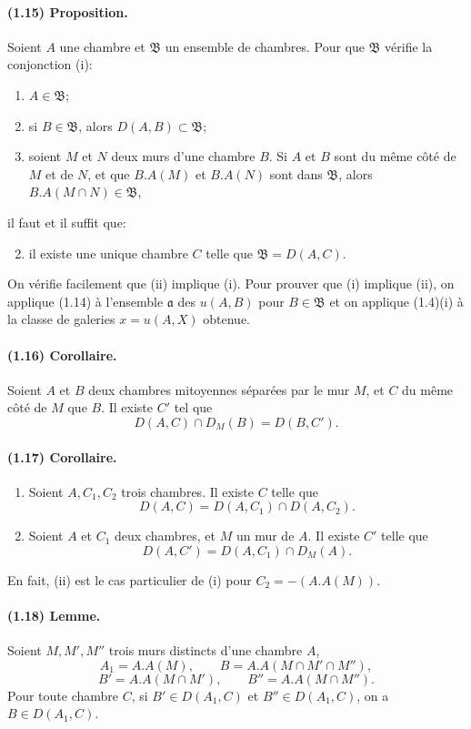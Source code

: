 \documentclass[10pt]{article}
\begin{document}
\paragraph{(1.15) Proposition.} Soient $A$ une chambre et $\mathfrak B$ un ensemble de chambres. Pour que $\mathfrak B$ vérifie la conjonction (i):
\begin{enumerate}[label=(i\alph*)]
\item $A\in\mathfrak B$;
\item si $B\in\mathfrak B$, alors $D(A,B)\subset\mathfrak B$;
\item soient $M$ et $N$ deux murs d'une chambre $B$. Si $A$ et $B$ sont du même côté de $M$ et de $N$, et que $B.A(M)$ et $B.A(N)$ sont dans $\mathfrak B$, alors $B.A(M\cap N)\in\mathfrak B$,
\end{enumerate}
il faut et il suffit que:
\begin{enumerate}[label=(\roman*)]
\setcounter{enumi}{1}
\item il existe une unique chambre $C$ telle que $\mathfrak B=D(A,C)$.
\end{enumerate}
On vérifie facilement que (ii) implique (i). Pour prouver que (i) implique (ii), on applique (1.14) à l'ensemble $\mathfrak a$ des $u(A,B)$ pour $B\in\mathfrak B$ et on applique (1.4)(i) à la classe de galeries $x=u(A,X)$ obtenue.

\paragraph{(1.16) Corollaire.} Soient $A$ et $B$ deux chambres mitoyennes séparées par le mur $M$, et $C$ du même côté de $M$ que $B$. Il existe $C'$ tel que
\[
D(A,C)\cap D_M(B)=D(B,C').
\]

\paragraph{(1.17) Corollaire.} \begin{enumerate}[label=(\roman*)]
\item Soient $A,C_1,C_2$ trois chambres. Il existe $C$ telle que
\[
\tag{1.17.1}
D(A,C)=D(A,C_1)\cap D(A,C_2).
\]
\item Soient $A$ et $C_1$ deux chambres, et $M$ un mur de $A$. Il existe $C'$ telle que
\[
\tag{1.17.2}
D(A,C')=D(A,C_1)\cap D_M(A).
\]
\end{enumerate}
En fait, (ii) est le cas particulier de (i) pour $C_2=-(A.A(M))$.

\paragraph{(1.18) Lemme.} Soient $M,M',M''$ trois murs distincts d'une chambre $A$,
\[
A_1=A.A(M),\qquad B=A.A(M\cap M'\cap M''),
\]
\[
B'=A.A(M\cap M'),\qquad B''=A.A(M\cap M'').
\]
Pour toute chambre $C$, si $B'\in D(A_1,C)$ et $B''\in D(A_1,C)$, on a $B\in D(A_1,C)$.
\end{document}
